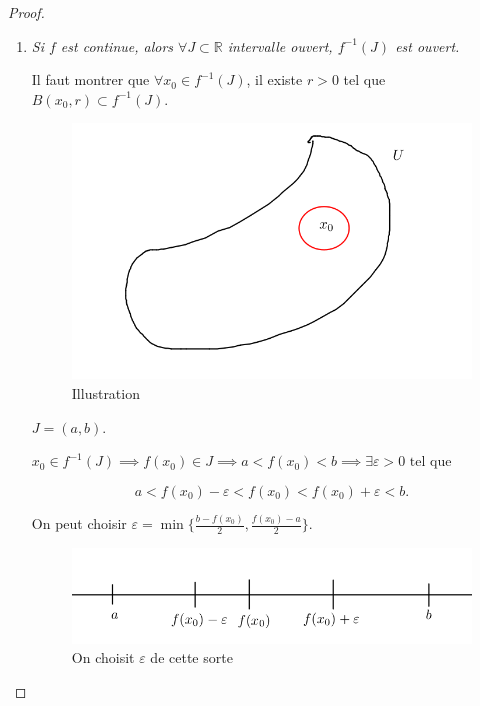 \documentclass[french]{article}
\theoremstyle{definition}
\theoremstyle{remark}
\newcommand{\lesss}{<}
\newcommand{\less}{\lesss}
\newcommand{\biggg}{>}
\newcommand{\bg}{\biggg}
\begin{document}
\begin{proof}
  \begin{enumerate}
    \item \emph{Si $f$ est continue, alors $ \forall J \subset \mathbb{R}$ intervalle ouvert, $f ^{-1} (J)$ est ouvert.}

    Il faut montrer que $\forall x_0 \in f ^{-1} (J)$, il existe $r \bg 0$ tel que $B(x_0, r) \subset f ^{-1} (J)$.

    \begin{figure}[h!]
      \centering
      \includegraphics[scale=0.3]{figures/recip_ouvert.png}
      \caption{Illustration}
      \label{}
    \end{figure}

    $J = (a,b)$.

    $x_0 \in f ^{-1} (J) \implies f(x_0) \in J \implies a \less f(x_0) \less b \implies \exists \varepsilon  \bg 0 \text{ tel que } $

    $$ a \less f(x_0) - \varepsilon \less f(x_0) \less f(x_0) + \varepsilon \less b.$$

    On peut choisir $\varepsilon = \min \{ \frac{b-f(x_0)}{2}, \frac{f(x_0)-a}{2} \} $.

    \begin{figure}[h!]
      \centering
      \includegraphics[scale=0.3]{figures/demo_prop_1.png}
      \caption{On choisit $\varepsilon $ de cette sorte}
      \label{}
    \end{figure}


\end{enumerate}
\end{proof}
\end{document}
